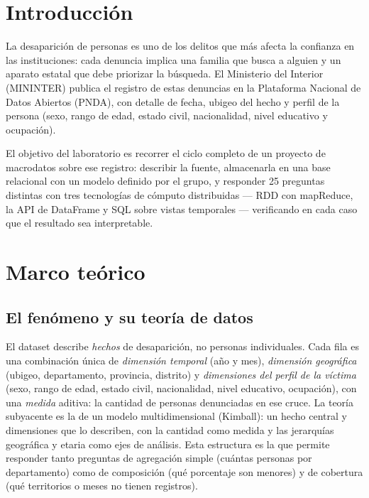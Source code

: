 \documentclass[10pt,a4paper]{article}
\theoremstyle{definition}
\begin{document}
\section{Introducci\'on}
La desaparici\'on de personas es uno de los delitos que m\'as afecta la confianza en las
instituciones: cada denuncia implica una familia que busca a alguien y un aparato estatal que
debe priorizar la b\'usqueda. El Ministerio del Interior (MININTER) publica el registro de estas
denuncias en la Plataforma Nacional de Datos Abiertos (PNDA), con detalle de fecha, ubigeo del
hecho y perfil de la persona (sexo, rango de edad, estado civil, nacionalidad, nivel educativo y
ocupaci\'on).

El objetivo del laboratorio es recorrer el ciclo completo de un proyecto de macrodatos sobre ese
registro: describir la fuente, almacenarla en una base relacional con un modelo definido por el
grupo, y responder 25 preguntas distintas con tres tecnolog\'ias de c\'omputo distribuidas ---
RDD con mapReduce, la API de DataFrame y SQL sobre vistas temporales --- verificando en cada caso
que el resultado sea interpretable.

\section{Marco te\'orico}

\subsection{El fen\'omeno y su teor\'ia de datos}
El dataset describe \emph{hechos} de desaparici\'on, no personas individuales. Cada fila es una
combinaci\'on \'unica de \emph{dimensi\'on temporal} (a\~no y mes), \emph{dimensi\'on
geogr\'afica} (ubigeo, departamento, provincia, distrito) y \emph{dimensiones del perfil de la
v\'ictima} (sexo, rango de edad, estado civil, nacionalidad, nivel educativo, ocupaci\'on), con
una \emph{medida} aditiva: la cantidad de personas denunciadas en ese cruce. La teor\'ia
subyacente es la de un modelo multidimensional (Kimball): un hecho central y dimensiones que lo
describen, con la cantidad como medida y las jerarqu\'ias geogr\'afica y etaria como ejes de
an\'alisis. Esta estructura es la que permite responder tanto preguntas de agregaci\'on simple
(cu\'antas personas por departamento) como de composici\'on (qu\'e porcentaje son menores) y de
cobertura (qu\'e territorios o meses no tienen registros).
\end{document}
